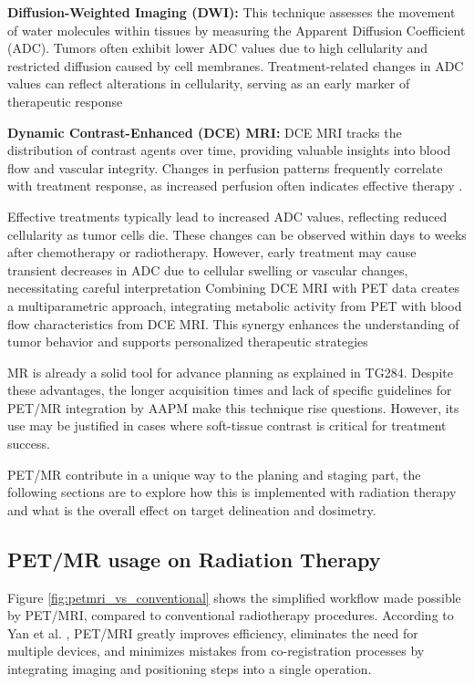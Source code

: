 \begin{multicols}{2}
\textbf{Diffusion-Weighted Imaging (DWI):} This technique assesses the movement of water molecules within tissues by measuring the Apparent Diffusion Coefficient (ADC). Tumors often exhibit lower ADC values due to high cellularity and restricted diffusion caused by cell membranes. Treatment-related changes in ADC values can reflect alterations in cellularity, serving as an early marker of therapeutic response \cite{pmc2010}%

\textbf{Dynamic Contrast-Enhanced (DCE) MRI:} DCE MRI tracks the distribution of contrast agents over time, providing valuable insights into blood flow and vascular integrity. Changes in perfusion patterns frequently correlate with treatment response, as increased perfusion often indicates effective therapy \cite{academic2021}.

Effective treatments typically lead to increased ADC values, reflecting reduced cellularity as tumor cells die. These changes can be observed within days to weeks after chemotherapy or radiotherapy. However, early treatment may cause transient decreases in ADC due to cellular swelling or vascular changes, necessitating careful interpretation \cite{pmc2010}%
Combining DCE MRI with PET data creates a multiparametric approach, integrating metabolic activity from PET with blood flow characteristics from DCE MRI. This synergy enhances the understanding of tumor behavior and supports personalized therapeutic strategies \cite{springer2024}%

MR is already a solid tool for advance planning as explained in TG284\cite{TG284}. Despite these advantages, the longer acquisition times and lack of specific guidelines for PET/MR integration by AAPM make this technique rise questions. However, its use may be justified in cases where soft-tissue contrast is critical for treatment success. 

PET/MR contribute in a unique way to the planing and staging part, the following sections are to explore how this is implemented with radiation therapy and what is the overall effect on target delineation and dosimetry.



\subsection{PET/MR usage on Radiation Therapy}

Figure \ref{fig:petmri_vs_conventional} shows the simplified workflow made possible by PET/MRI, compared to conventional radiotherapy procedures. According to Yan et al. \cite{yan2024}, PET/MRI greatly improves efficiency, eliminates the need for multiple devices, and minimizes mistakes from co-registration processes by integrating imaging and positioning steps into a single operation.

\end{multicols}

